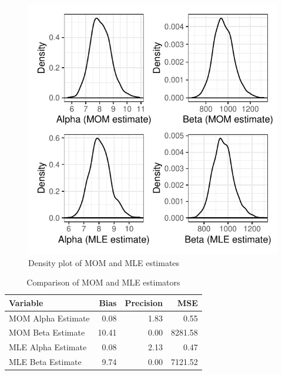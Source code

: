 \documentclass{article}\usepackage[]{graphicx}\usepackage[]{xcolor}
\begin{document}
\begin{multicols}{2}
 \begin{figure}[H]
 \begin{center}
 \includegraphics[scale=0.7]{estimate_density.pdf}
 \caption{Density plot of MOM and MLE estimates}
 \label{fig6}
 \end{center}
 \end{figure}





\begin{table}[H]
\centering
\begingroup\small
\begin{tabular}{lrrr}
  \hline
Variable & Bias & Precision & MSE \\ 
  \hline
MOM Alpha Estimate & 0.08 & 1.83 & 0.55 \\ 
  MOM Beta Estimate & 10.41 & 0.00 & 8281.58 \\ 
  MLE Alpha Estimate & 0.08 & 2.13 & 0.47 \\ 
  MLE Beta Estimate & 9.74 & 0.00 & 7121.52 \\ 
   \hline
\end{tabular}
\endgroup
\caption{Comparison of MOM and MLE estimators} 
\label{mommle.tab}
\end{table}


\vspace{2em}

\begin{tiny}

\end{tiny}
\end{multicols}

\end{document}
